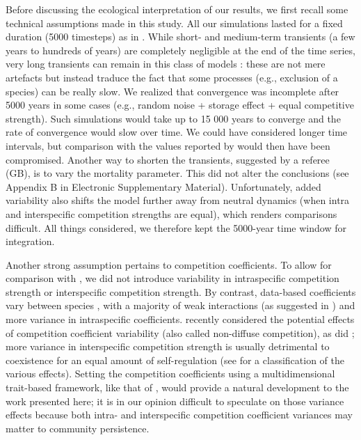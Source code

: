 \documentclass[a4paper,12pt]{article}
\begin{document}
Before discussing the ecological interpretation of our results, we
first recall some technical assumptions made in this study. All our
simulations lasted for a fixed duration (5000 timesteps) as in \citet{scranton_coexistence_2016}.
While short- and medium-term transients (a few years to hundreds of
years) are completely negligible at the end of the time series, very
long transients can remain in this class of models \citep{scheffer_self-organized_2006,hastings_transient_2018}:
these are not mere artefacts but instead traduce the fact that some
processes (e.g., exclusion of a species) can be really slow. We realized
that convergence was incomplete after 5000 years in some cases (e.g.,
random noise + storage effect + equal competitive strength). Such
simulations would take up to 15 000 years to converge and the rate
of convergence would slow over time. We could have considered longer
time intervals, but comparison with the values reported by \citet{scranton_coexistence_2016}
would then have been compromised. Another way to shorten the transients,
suggested by a referee (GB), is to vary the mortality parameter. This
did not alter the conclusions (see Appendix B in Electronic Supplementary
Material). Unfortunately, added variability also shifts the model
further away from neutral dynamics (when intra and interspecific competition
strengths are equal), which renders comparisons difficult. All things
considered, we therefore kept the 5000-year time window for integration.

Another strong assumption pertains to competition coefficients. To
allow for comparison with \citet{scranton_coexistence_2016}, we did
not introduce variability in intraspecific competition strength or
interspecific competition strength. By contrast, data-based coefficients
vary between species \citep{barraquand2018coastal}, with a majority
of weak interactions (as suggested in \citealp{wootton_measurement_2005})
and more variance in intraspecific coefficients. \citet{stump_multispecies_2017}
recently considered the potential effects of competition coefficient
variability (also called non-diffuse competition), as did \citet{kokkoris_variability_2002};
more variance in interspecific competition strength is usually detrimental
to coexistence for an equal amount of self-regulation (see \citet{stump_multispecies_2017}
for a classification of the various effects). Setting the competition
coefficients using a multidimensional trait-based framework, like
that of \citet{ashby_competing_2017}, would provide a natural development
to the work presented here; it is in our opinion difficult to speculate
on those variance effects because both intra- and interspecific competition
coefficient variances may matter to community persistence.
\end{document}
